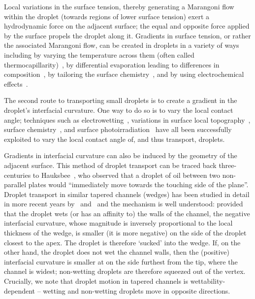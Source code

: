 Local variations in the surface tension, thereby generating a Marangoni flow within the droplet (towards regions of lower surface tension) exert a hydrodynamic force on the adjacent surface; the equal and opposite force applied by the surface propels the droplet along it.  Gradients in surface tension, or rather the associated Marangoni flow, can be created in droplets in a variety of ways including by varying the temperature across them (often called thermocapillarity)~\citep{Brzoska1993Langmuir, Pratap2008Langmuir}, by differential evaporation leading to differences in composition~\citep{Thomson1855}, by tailoring the surface chemistry~\citep{COTTINGTON1964, John2005EPJE}, and by using electrochemical effects~\citep{Gallardo1999Science}.


The second route to transporting small droplets is to create a gradient in the droplet's interfacial curvature. One way to do so is to vary the local contact angle; techniques such as electrowetting~\citep{Lippmann1875, Mugele2005JPhysCond}, variations in surface local topography~\citep{Shastry2006Langmuir}, surface chemistry~\citep{DosSantos1995PRL,Chaudhury1992Science,Daniel2001Science}, and surface photoirradiation~\citep{Ichimura2000Science} have all been successfully exploited to vary the local contact angle of, and thus transport, droplets.

Gradients in interfacial curvature can also be induced by the geometry of the adjacent surface. This method of droplet transport can be traced back three-centuries to Hauksbee~\citep{Hauksbee1710iii}, who observed that a droplet of oil between two non-parallel plates would  ``immediately move towards the touching side of the plane''. Droplet transport in similar tapered channels (wedges) has been studied in detail in more recent years by~\cite{Renvoise2009EPL} and~\cite{Reyssat2014JFM} and the mechanism is well understood: provided that the droplet wets (or has an affinity to) the walls of the channel, the negative interfacial curvature, whose magnitude is inversely proportional  to the local thickness of the wedge, is smaller (it is more negative) on the side of the droplet closest to the apex. The droplet is therefore `sucked' into the wedge. If, on the other hand, the droplet does not wet the channel walls, then the (positive) interfacial curvature is smaller at on the side furthest from the tip, where the channel is widest; non-wetting droplets are therefore squeezed out of the vertex. Crucially, we note that droplet motion in tapered channels is wettability-dependent -- wetting and non-wetting droplets move in opposite directions.

